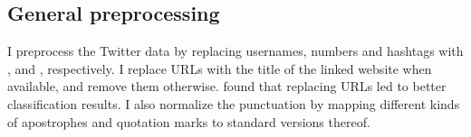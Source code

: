 \subsection{General preprocessing}

I preprocess the Twitter data by replacing usernames, numbers and hashtags with \username, \numberesc{} and \hashtag, respectively.
I replace URLs with the title of the linked website when available, and remove them otherwise.
\citet{chiril2020annotated} found that replacing URLs led to better classification results.
I also normalize the punctuation by mapping different kinds of apostrophes and quotation marks to standard versions thereof.

